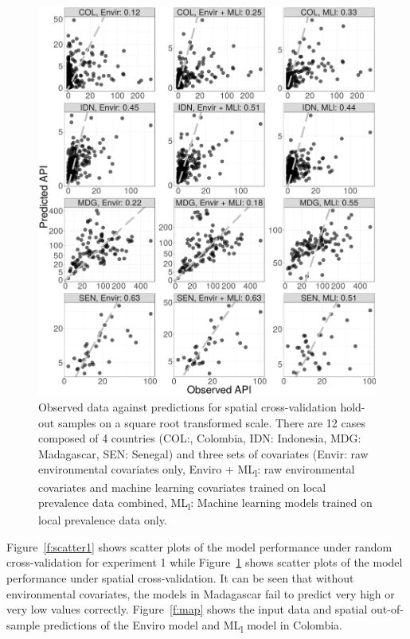 \documentclass[review]{elsarticle}
\begin{document}
\begin{figure}
  \includegraphics[width=\textwidth]{figs/cv2_l_scatter.png}
\caption{
  Observed data against predictions for spatial cross-validation hold-out samples on a square root transformed scale.
  There are 12 cases composed of 4 countries (COL:, Colombia, IDN: Indonesia, MDG: Madagascar, SEN: Senegal) and three sets of covariates (Envir: raw environmental covariates only, Enviro +  ML\textsubscript{l}: raw environmental covariates and machine learning covariates trained on local prevalence data combined, ML\textsubscript{l}: Machine learning models trained on local prevalence data only.
}
\label{f:scatter2}
\end{figure}

Figure~\ref{f:scatter1} shows scatter plots of the model performance under random cross-validation for experiment 1 while Figure~\ref{f:scatter2} shows scatter plots of the model performance under spatial cross-validation.
It can be seen that without environmental covariates, the models in Madagascar fail to predict very high or very low values correctly.
Figure~\ref{f:map} shows the input data and spatial out-of-sample predictions of the Enviro model and ML\textsubscript{l} model in Colombia.
\end{document}

